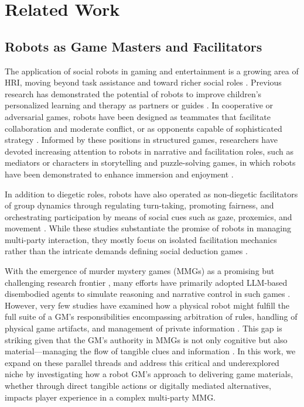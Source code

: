 \documentclass[sigconf,screen]{acmart-tagged}
\newcommand{\rev}[1]{#1}
\begin{document}
\vspace{-8pt}
\section{Related Work}
\subsection{Robots as Game Masters and Facilitators}
The application of social robots in gaming and entertainment is a growing area of HRI, \rev{moving beyond task assistance and toward richer social roles} \cite{rato2023robots, munoz2021robo, sandoval2022human}. Previous research \rev{has demonstrated the potential of robots to improve children's personalized learning and therapy as partners or guides \cite{ligthart2023design, shiomi2021two, kouroupa2022use, rakhymbayeva2021long}. In cooperative or adversarial games, robots have been designed as teammates that facilitate collaboration and moderate conflict, or as opponents capable of sophisticated strategy \cite{correia2018group, nichols2021collaborative, lombardi2025would}. Informed by these positions in structured games,} researchers have devoted increasing attention to robots in narrative and facilitation roles, such as mediators or characters in storytelling and puzzle-solving games, in which robots have been demonstrated to enhance immersion and enjoyment \cite{lin2022benefits, ng2024role}. 

In addition to diegetic roles, robots have also operated as non-diegetic facilitators of group dynamics through regulating turn-taking, promoting fairness, and orchestrating participation by means of social cues such as gaze, proxemics, and movement \cite{short2017robot, short2015towards, mutlu2009footing, buchem2024human}. While these studies substantiate the promise of robots in managing multi-party interaction, they mostly focus on isolated facilitation mechanics rather than the intricate demands defining social deduction games \cite{lin2022benefits, ng2024role, short2017robot}.

With the emergence of murder mystery games (MMGs) as a promising but challenging research frontier \cite{bowman2025transformative, wu2023deciphering, zhu2024player, nonomura2025speaks}, many efforts have primarily adopted LLM-based disembodied agents to simulate reasoning and narrative control in such games \cite{wu2023deciphering, zhu2024player, lombardi2025would, nonomura2025speaks}. However, very few studies have examined how a physical robot might fulfill the full suite of a GM's responsibilities encompassing arbitration of rules, handling of physical game artifacts, and management of private information \cite{lin2022benefits, ng2024role, kennington2014probabilistic}. \rev{This gap is striking given that the GM's authority in MMGs is not only cognitive but also material—managing the flow of tangible clues and information \cite{bowman2025transformative, xiong2020murder}. In this work, we expand on these parallel threads and address this critical and underexplored niche by investigating how a robot GM's approach to delivering game materials, whether through direct tangible actions or digitally mediated alternatives, impacts player experience in a complex multi-party MMG.}
\end{document}
